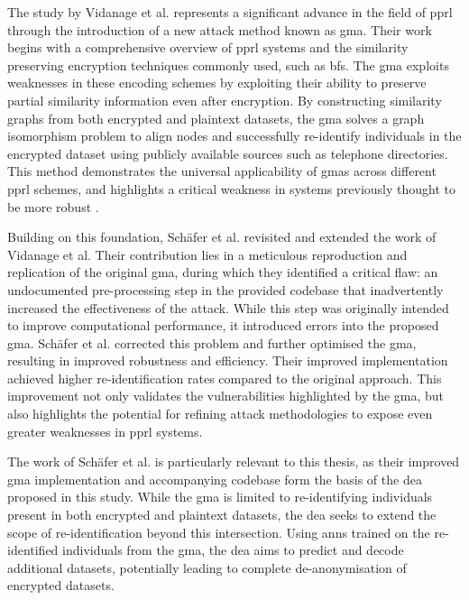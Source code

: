 The study by Vidanage et al. \cite{vidanage2020graph} represents a significant advance in the field of \ac{pprl} through the introduction of a new attack method known as \ac{gma}. 
Their work begins with a comprehensive overview of \ac{pprl} systems and the similarity preserving encryption techniques commonly used, such as \ac{bf}s. 
The \ac{gma} exploits weaknesses in these encoding schemes by exploiting their ability to preserve partial similarity information even after encryption. 
By constructing similarity graphs from both encrypted and plaintext datasets, the \ac{gma} solves a graph isomorphism problem to align nodes and successfully re-identify individuals in the encrypted dataset using publicly available sources such as telephone directories. 
This method demonstrates the universal applicability of \ac{gma}s across different \ac{pprl} schemes, and highlights a critical weakness in systems previously thought to be more robust \cite{vidanage2020graph}.

Building on this foundation, Schäfer et al. \cite{schaefer2024} revisited and extended the work of Vidanage et al. 
Their contribution lies in a meticulous reproduction and replication of the original \ac{gma}, during which they identified a critical flaw: an undocumented pre-processing step in the provided codebase that inadvertently increased the effectiveness of the attack. 
While this step was originally intended to improve computational performance, it introduced errors into the proposed \ac{gma}. 
Schäfer et al. corrected this problem and further optimised the \ac{gma}, resulting in improved robustness and efficiency. 
Their improved implementation achieved higher re-identification rates compared to the original approach. 
This improvement not only validates the vulnerabilities highlighted by the \ac{gma}, but also highlights the potential for refining attack methodologies to expose even greater weaknesses in \ac{pprl} systems.

The work of Schäfer et al. is particularly relevant to this thesis, as their improved \ac{gma} implementation and accompanying codebase form the basis of the \ac{dea} proposed in this study. 
While the \ac{gma} is limited to re-identifying individuals present in both encrypted and plaintext datasets, the \ac{dea} seeks to extend the scope of re-identification beyond this intersection. 
Using \ac{ann}s trained on the re-identified individuals from the \ac{gma}, the \ac{dea} aims to predict and decode additional datasets, potentially leading to complete de-anonymisation of encrypted datasets.

